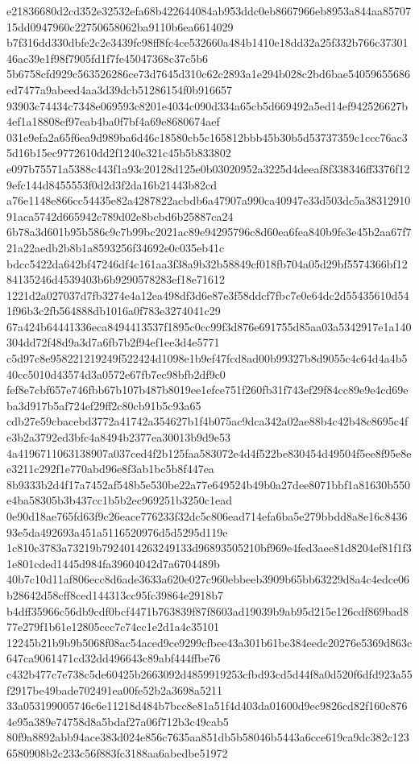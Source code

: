\documentclass[11pt,a4paper]{article}
\begin{document}
{e21836680d2cd352e32532efa68b422644084ab953ddc0eb8667966eb8953a844aa8570715dd0947960c22750658062ba9110b6ea6614029
b7f316dd330dbfe2c2e3439fc98ff8fc4ce532660a484b1410e18dd32a25f332b766c3730146ac39e1f98f7905fd1f7fe45047368c37c5b6
5b6758cfd929c563526286ce73d7645d310c62c2893a1e294b028c2bd6bae54059655686ed7477a9abeed4aa3d39dcb51286154f0b916657
93903c74434c7348e069593c8201e4034c090d334a65cb5d669492a5ed14ef942526627b4ef1a18808ef97eab4ba0f7bf4a69e8680674aef
031e9efa2a65f6ea9d989ba6d46c18580cb5c165812bbb45b30b5d53737359c1ccc76ac35d16b15ec9772610dd2f1240e321c45b5b833802
e097b75571a5388c443f1a93c20128d125e0b03020952a3225d4deeaf8f338346ff3376f129efc144d8455553f0d2d3f2da16b21443b82cd
a76e1148e866cc54435e82a4287822acbdb6a47907a990ca40947e33d503dc5a3831291091aca5742d665942c789d02e8bcbd6b25887ca24
6b78a3d601b95b586c9c7b99bc2021ac89e94295796c8d60ea6fea840b9fe3e45b2aa67f721a22aedb2b8b1a8593256f34692e0c035eb41c
bdcc5422da642bf47246df4c161aa3f38a9b32b58849cf018fb704a05d29bf5574366bf1284135246d4539403b6b9290578283ef18e71612
1221d2a027037d7fb3274e4a12ea498df3d6e87e3f58ddcf7fbc7e0e64dc2d55435610d541f96b3c2fb564888db1016a0f783e3274041c29
67a424b64441336eca8494413537f1895c0cc99f3d876e691755d85aa03a5342917e1a140304dd72f48d9a3d7a6fb7b2f94ef1ee3d4e5771
c5d97c8e958221219249f522424d1098e1b9ef47fcd8ad00b99327b8d9055c4c64d4a4b540cc5010d43574d3a0572e67fb7ec98bfb2df9c0
fef8e7cbf657e746fbb67b107b487b8019ee1efce751f260fb31f743ef29f84cc89e9e4cd69eba3d917b5af724ef29ff2c80cb91b5c93a65
cdb27e59cbacebd3772a41742a354627b1f4b075ac9dca342a02ae88b4c42b48c8695c4fe3b2a3792ed3bfc4a8494b2377ea30013b9d9e53
4a4196711063138907a037ced4f2b125faa583072e4d4f522be830454d49504f5ee8f95e8ee3211c292f1e770abd96e8f3ab1bc5b8f447ea
8b9333b2d4f17a7452af548b5e530be22a77e649524b49b0a27dee8071bbf1a81630b550e4ba58305b3b437cc1b5b2ec969251b3250c1ead
0e90d18ae765fd63f9c26eace776233f32dc5c806ead714efa6ba5e279bbdd8a8e16c843693e5da492693a451a5116520976d5d5295d119e
1c810c3783a73219b7924014263249133d96893505210bf969e4fed3aee81d8204ef81f1f31e801cded1445d984fa39604042d7a6704489b
40b7c10d11af806ecc8d6ade3633a620e027c960ebbeeb3909b65bb63229d8a4c4edce06b28642d58cff8ced144313cc95fc39864e2918b7
b4dff35966c56db9cdf0bcf4471b763839f87f8603ad19039b9ab95d215e126cdf869bad877e279f1b61e12805ccc7c74cc1e2d1a4c35101
12245b21b9b9b5068f08ac54aced9ce9299cfbee43a301b61be384eedc20276e5369d863c647ca9061471cd32dd496643c89abf444ffbe76
c432b477c7e738c5de60425b2663092d4859919253cfbd93cd5d44f8a0d520f6dfd923a55f2917be49bade702491ea00fe52b2a3698a5211
33a053199005746c6e11218d484b7bcc8e81a51f4d403da01600d9ec9826cd82f160c8764e95a389e74758d8a5bdaf27a06f712b3c49cab5
80f9a8892abb94ace383d024e856c7635aa851db5b58046b5443a6cce619ca9dc382c1236580908b2c233c56f883fc3188aa6abedbe51972
}
\end{document}
